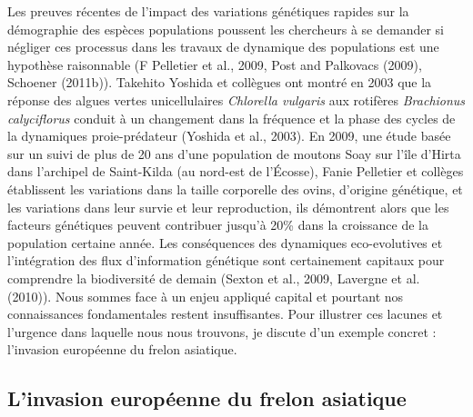 Les preuves récentes de l'impact des variations génétiques rapides sur
la démographie des espèces populations poussent les chercheurs à se
demander si négliger ces processus dans les travaux de dynamique des
populations est une hypothèse raisonnable (F Pelletier et al., 2009,
Post and Palkovacs (2009), Schoener (2011b)). Takehito Yoshida et
collègues ont montré en 2003 que la réponse des algues vertes
unicellulaires \emph{Chlorella vulgaris} aux rotifères \emph{Brachionus
calyciflorus} conduit à un changement dans la fréquence et la phase des
cycles de la dynamiques proie-prédateur (Yoshida et al., 2003). En 2009,
une étude basée sur un suivi de plus de 20 ans d'une population de
moutons Soay sur l'île d'Hirta dans l'archipel de Saint-Kilda (au
nord-est de l'Écosse), Fanie Pelletier et collèges établissent les
variations dans la taille corporelle des ovins, d'origine génétique, et
les variations dans leur survie et leur reproduction, ils démontrent
alors que les facteurs génétiques peuvent contribuer jusqu'à 20\% dans
la croissance de la population certaine année. Les conséquences des
dynamiques eco-evolutives et l'intégration des flux d'information
génétique sont certainement capitaux pour comprendre la biodiversité de
demain (Sexton et al., 2009, Lavergne et al. (2010)). Nous sommes face à
un enjeu appliqué capital et pourtant nos connaissances fondamentales
restent insuffisantes. Pour illustrer ces lacunes et l'urgence dans
laquelle nous nous trouvons, je discute d'un exemple concret :
l'invasion européenne du frelon asiatique.

\subsection*{L'invasion européenne du frelon
asiatique}\label{linvasion-europuxe9enne-du-frelon-asiatique}

